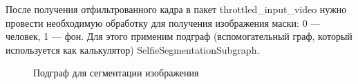\documentclass[a4paper,14pt]{extreport}
\begin{document}
        После получения отфильтрованного кадра в пакет throttled\_input\_video нужно провести необходимую обработку для получения изображения маски: 0 — человек, 1 — фон. Для этого применим подграф (вспомогательный граф, который используется как калькулятор) SelfieSegmentationSubgraph.
        \begin{figure}[h]
            \caption{Подграф для сегментации изображения}
            \label{ris:subgraph}
        \end{figure}
        
\end{document}
